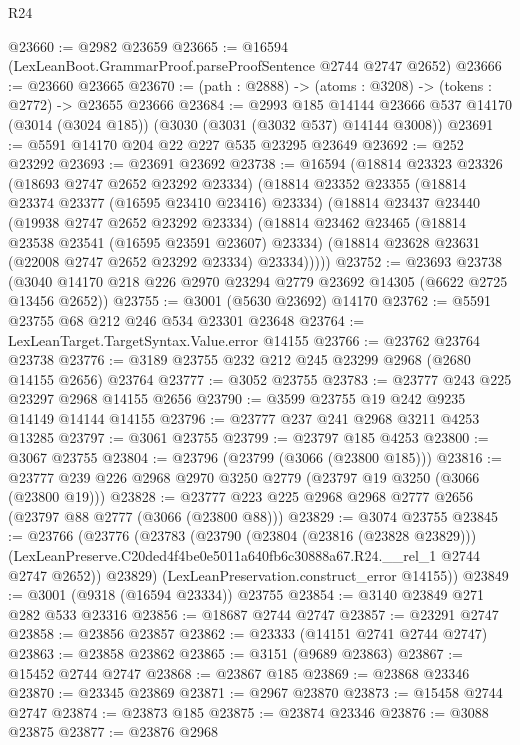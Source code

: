 \begin{lexlean}{R24}
\begin{coremodule}
@23660 := @2982 @23659
@23665 := @16594 (LexLeanBoot.GrammarProof.parseProofSentence @2744 @2747 @2652)
@23666 := @23660 @23665
@23670 := (path : @2888) -> (atoms : @3208) -> (tokens : @2772) -> @23655 @23666
@23684 := @2993
    @185
    @14144
    @23666
    @537
    @14170
    (@3014 (@3024 @185))
    (@3030 (@3031 (@3032 @537) @14144 @3008))
@23691 := @5591 @14170 @204 @22 @227 @535 @23295 @23649
@23692 := @252 @23292
@23693 := @23691 @23692
@23738 := @16594
    (@18814
      @23323
      @23326
      (@18693 @2747 @2652 @23292 @23334)
      (@18814
        @23352
        @23355
        (@18814 @23374 @23377 (@16595 @23410 @23416) @23334)
        (@18814
          @23437
          @23440
          (@19938 @2747 @2652 @23292 @23334)
          (@18814
            @23462
            @23465
            (@18814 @23538 @23541 (@16595 @23591 @23607) @23334)
            (@18814 @23628 @23631 (@22008 @2747 @2652 @23292 @23334) @23334)))))
@23752 := @23693
    @23738
    (@3040 @14170 @218 @226 @2970 @23294 @2779 @23692 @14305 (@6622 @2725 @13456 @2652))
@23755 := @3001 (@5630 @23692) @14170
@23762 := @5591 @23755 @68 @212 @246 @534 @23301 @23648
@23764 := LexLeanTarget.TargetSyntax.Value.error @14155
@23766 := @23762 @23764 @23738
@23776 := @3189 @23755 @232 @212 @245 @23299 @2968 (@2680 @14155 @2656) @23764
@23777 := @3052 @23755
@23783 := @23777 @243 @225 @23297 @2968 @14155 @2656
@23790 := @3599 @23755 @19 @242 @9235 @14149 @14144 @14155
@23796 := @23777 @237 @241 @2968 @3211 @4253 @13285
@23797 := @3061 @23755
@23799 := @23797 @185 @4253
@23800 := @3067 @23755
@23804 := @23796 (@23799 (@3066 (@23800 @185)))
@23816 := @23777 @239 @226 @2968 @2970 @3250 @2779 (@23797 @19 @3250 (@3066 (@23800 @19)))
@23828 := @23777 @223 @225 @2968 @2968 @2777 @2656 (@23797 @88 @2777 (@3066 (@23800 @88)))
@23829 := @3074 @23755
@23845 := @23766
    (@23776
      (@23783
        (@23790
          (@23804 (@23816 (@23828 @23829)))
          (LexLeanPreserve.C20ded4f4be0e5011a640fb6c30888a67.R24.__rel_1 @2744 @2747 @2652))
        @23829)
      (LexLeanPreservation.construct_error @14155))
@23849 := @3001 (@9318 (@16594 @23334)) @23755
@23854 := @3140 @23849 @271 @282 @533 @23316
@23856 := @18687 @2744 @2747
@23857 := @23291 @2747
@23858 := @23856 @23857
@23862 := @23333 (@14151 @2741 @2744 @2747)
@23863 := @23858 @23862
@23865 := @3151 (@9689 @23863)
@23867 := @15452 @2744 @2747
@23868 := @23867 @185
@23869 := @23868 @23346
@23870 := @23345 @23869
@23871 := @2967 @23870
@23873 := @15458 @2744 @2747
@23874 := @23873 @185
@23875 := @23874 @23346
@23876 := @3088 @23875
@23877 := @23876 @2968

\end{coremodule}
\end{lexlean}
